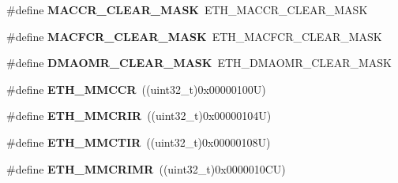 \begin{DoxyCompactItemize}
\item 
\hypertarget{group___h_a_l___e_t_h___aliased___defines_ga6415e52119d875b78a80ee4186233643}{\#define {\bfseries M\-A\-C\-C\-R\-\_\-\-C\-L\-E\-A\-R\-\_\-\-M\-A\-S\-K}~E\-T\-H\-\_\-\-M\-A\-C\-C\-R\-\_\-\-C\-L\-E\-A\-R\-\_\-\-M\-A\-S\-K}\label{group___h_a_l___e_t_h___aliased___defines_ga6415e52119d875b78a80ee4186233643}

\item 
\hypertarget{group___h_a_l___e_t_h___aliased___defines_ga0fc15b5e25134974f3a371c17882e36d}{\#define {\bfseries M\-A\-C\-F\-C\-R\-\_\-\-C\-L\-E\-A\-R\-\_\-\-M\-A\-S\-K}~E\-T\-H\-\_\-\-M\-A\-C\-F\-C\-R\-\_\-\-C\-L\-E\-A\-R\-\_\-\-M\-A\-S\-K}\label{group___h_a_l___e_t_h___aliased___defines_ga0fc15b5e25134974f3a371c17882e36d}

\item 
\hypertarget{group___h_a_l___e_t_h___aliased___defines_gad1b188dfe2cdaea68fb36806a0b94b95}{\#define {\bfseries D\-M\-A\-O\-M\-R\-\_\-\-C\-L\-E\-A\-R\-\_\-\-M\-A\-S\-K}~E\-T\-H\-\_\-\-D\-M\-A\-O\-M\-R\-\_\-\-C\-L\-E\-A\-R\-\_\-\-M\-A\-S\-K}\label{group___h_a_l___e_t_h___aliased___defines_gad1b188dfe2cdaea68fb36806a0b94b95}

\item 
\hypertarget{group___h_a_l___e_t_h___aliased___defines_ga340605767fdf406c393f046be44a1e09}{\#define {\bfseries E\-T\-H\-\_\-\-M\-M\-C\-C\-R}~((uint32\-\_\-t)0x00000100\-U)}\label{group___h_a_l___e_t_h___aliased___defines_ga340605767fdf406c393f046be44a1e09}

\item 
\hypertarget{group___h_a_l___e_t_h___aliased___defines_gaa49af339607e5c30c69d55f4941fd775}{\#define {\bfseries E\-T\-H\-\_\-\-M\-M\-C\-R\-I\-R}~((uint32\-\_\-t)0x00000104\-U)}\label{group___h_a_l___e_t_h___aliased___defines_gaa49af339607e5c30c69d55f4941fd775}

\item 
\hypertarget{group___h_a_l___e_t_h___aliased___defines_gab53a2a3649b1b96533c3bb8f2dfca221}{\#define {\bfseries E\-T\-H\-\_\-\-M\-M\-C\-T\-I\-R}~((uint32\-\_\-t)0x00000108\-U)}\label{group___h_a_l___e_t_h___aliased___defines_gab53a2a3649b1b96533c3bb8f2dfca221}

\item 
\hypertarget{group___h_a_l___e_t_h___aliased___defines_ga42e63a205698925c20f69be3d711ae59}{\#define {\bfseries E\-T\-H\-\_\-\-M\-M\-C\-R\-I\-M\-R}~((uint32\-\_\-t)0x0000010\-C\-U)}\label{group___h_a_l___e_t_h___aliased___defines_ga42e63a205698925c20f69be3d711ae59}


\end{DoxyCompactItemize}
